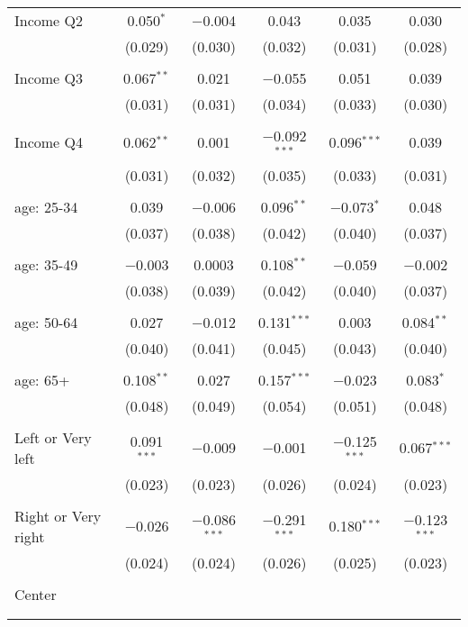 \begin{tabular}{@{\extracolsep{5pt}}lccccc}
 Income Q2 & 0.050$^{*}$ & $-$0.004 & 0.043 & 0.035 & 0.030 \\ 
  & (0.029) & (0.030) & (0.032) & (0.031) & (0.028) \\ 
  & & & & & \\ 
 Income Q3 & 0.067$^{**}$ & 0.021 & $-$0.055 & 0.051 & 0.039 \\ 
  & (0.031) & (0.031) & (0.034) & (0.033) & (0.030) \\ 
  & & & & & \\ 
 Income Q4 & 0.062$^{**}$ & 0.001 & $-$0.092$^{***}$ & 0.096$^{***}$ & 0.039 \\ 
  & (0.031) & (0.032) & (0.035) & (0.033) & (0.031) \\ 
  & & & & & \\ 
 age: 25-34 & 0.039 & $-$0.006 & 0.096$^{**}$ & $-$0.073$^{*}$ & 0.048 \\ 
  & (0.037) & (0.038) & (0.042) & (0.040) & (0.037) \\ 
  & & & & & \\ 
 age: 35-49 & $-$0.003 & 0.0003 & 0.108$^{**}$ & $-$0.059 & $-$0.002 \\ 
  & (0.038) & (0.039) & (0.042) & (0.040) & (0.037) \\ 
  & & & & & \\ 
 age: 50-64 & 0.027 & $-$0.012 & 0.131$^{***}$ & 0.003 & 0.084$^{**}$ \\ 
  & (0.040) & (0.041) & (0.045) & (0.043) & (0.040) \\ 
  & & & & & \\ 
 age: 65+ & 0.108$^{**}$ & 0.027 & 0.157$^{***}$ & $-$0.023 & 0.083$^{*}$ \\ 
  & (0.048) & (0.049) & (0.054) & (0.051) & (0.048) \\ 
  & & & & & \\ 
 Left or Very left & 0.091$^{***}$ & $-$0.009 & $-$0.001 & $-$0.125$^{***}$ & 0.067$^{***}$ \\ 
  & (0.023) & (0.023) & (0.026) & (0.024) & (0.023) \\ 
  & & & & & \\ 
 Right or Very right & $-$0.026 & $-$0.086$^{***}$ & $-$0.291$^{***}$ & 0.180$^{***}$ & $-$0.123$^{***}$ \\ 
  & (0.024) & (0.024) & (0.026) & (0.025) & (0.023) \\ 
  & & & & & \\ 
 Center &  &  &  &  &  \\ 
  &  &  &  &  &  \\ 
  & & & & & \\ 

\end{tabular}
